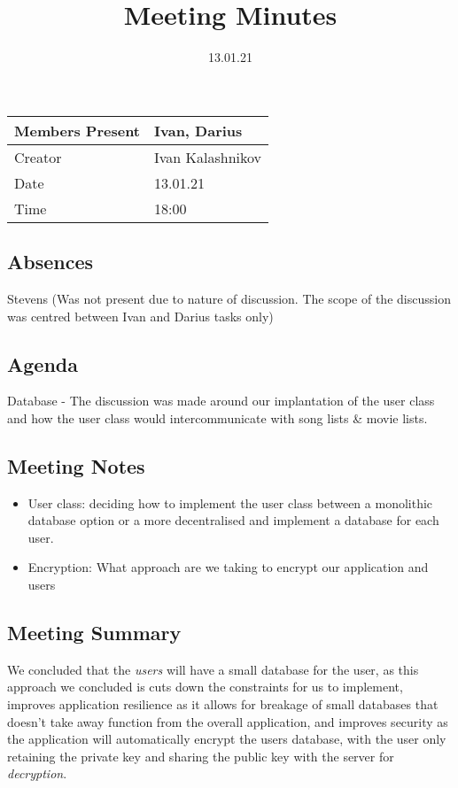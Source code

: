 \documentclass{article}
\title{Meeting Minutes}
\date{13.01.21}
\begin{document}
\maketitle

\begin{center}
    \begin{tabular}{ | l | p{14cm} |}
    \hline
    Members Present & Ivan, Darius \\ \hline
    Creator         & Ivan Kalashnikov \\ \hline
    Date            & 13.01.21 \\ \hline
    Time            & 18:00 \\ \hline
    \end{tabular}
\end{center}

\subsection{Absences}

Stevens (Was not present due to nature of discussion. The scope of the discussion was centred between Ivan and Darius tasks only)

\subsection{Agenda}

Database - The discussion was made around our implantation of the user class and how the user class would intercommunicate with song lists \& movie lists. 

\subsection{Meeting Notes}
\begin{itemize}
	\item User class: deciding how to implement the user class between a monolithic database option or a more decentralised and implement a database for each user. 
	\item Encryption: What approach are we taking to encrypt our application and users 
\end{itemize}

\subsection{Meeting Summary}

We concluded that the \textit{users} will have a small database for the user, as this approach we concluded is cuts down the constraints for us to implement, improves application resilience as it allows for breakage of small databases that doesn't take away function from the overall application, and improves security as the application will automatically encrypt the users database, with the user only retaining the private key and sharing the public key with the server for \textit{decryption}.
\end{document}
